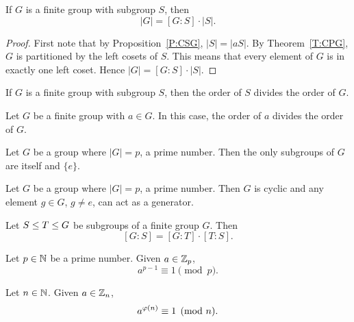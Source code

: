 \documentclass{ximera}
\begin{document}
\begin{theorem}\label{T:lagrange}
  If $G$ is a finite group with subgroup $S$, then 
  \[
  |G| = [G:S]\cdot |S|.
  \]
  \begin{proof}
    First note that by Proposition~\ref{P:CSG}, $|S| = |aS|$. By
    Theorem~\ref{T:CPG}, $G$ is partitioned by the left cosets of
    $S$. This means that every element of $G$ is in exactly one left
    coset. Hence $|G| = [G:S]\cdot |S|$.
  \end{proof}
\end{theorem}

\begin{corollary}
  If $G$ is a finite group with subgroup $S$, then the order of $S$
  divides the order of $G$.
\end{corollary}

\begin{corollary}
  Let $G$ be a finite group with $a\in G$. In this case, the order of
  $a$ divides the order of $G$.
\end{corollary}


\begin{corollary}
  Let $G$ be a group where $|G|= p$, a prime number. Then the only
  subgroups of $G$ are itself and $\{e\}$.
\end{corollary}

\begin{corollary}
  Let $G$ be a group where $|G|= p$, a prime number. Then $G$ is
  cyclic and any element $g\in G$, $g\ne e$, can act as a generator.
\end{corollary}


\begin{corollary}
  Let $S \leq T \leq G$ be subgroups of a finite group
  $G$. Then
  \[
  [G:S] = [G:T]\cdot [T:S].
  \]
\end{corollary}


\begin{corollary}
  Let $p\in \mathbb N$ be a prime number. Given $a\in\mathbb Z_p$,
  \[
  a^{p-1}\equiv 1 \pmod{p}.
  \]
\end{corollary}


\begin{corollary}
  Let $n\in \mathbb N$. Given $a\in\mathbb Z_n$,
  \[
  a^{\eulerphi(n)}\equiv 1 \pmod{n}.
  \]
\end{corollary}
\end{document}
